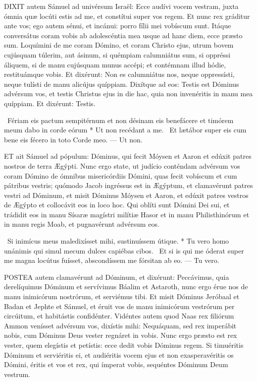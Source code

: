 
\lettrine[lines=2]{D}{IXIT} autem Sámuel ad univérsum Israël: Ecce audívi vocem vestram, juxta ómnia quæ locúti estis ad me, et constítui super vos regem. Et nunc rex gráditur ante vos; ego autem sénui, et incánui: porro fílii mei vobíscum sunt. Itáque conversátus coram vobis ab adolescéntia mea usque ad hanc diem, ecce præsto sum. Loquímini de me coram Dómino, et coram Christo ejus, utrum bovem cujúsquam túlerim, aut ásinum, si quémpiam calumniátus sum, si oppréssi áliquem, si de manu cujúsquam munus accépi; et contémnam illud hódie, restituámque vobis. Et dixérunt: Non es calumniátus nos, neque oppressísti, neque tulísti de manu alicújus quíppiam. Dixítque ad eos: Testis est Dóminus advérsum vos, et testis Christus ejus in die hac, quia non invenéritis in manu mea quíppiam. Et dixérunt: Testis.

\R\ Fériam eis pactum sempitérnum et non désinam eis benefácere et timórem meum dabo in corde eórum * Ut non recédant a me. \V\ Et lætábor super eis cum bene eis fécero in toto Corde meo. --- Ut non.


\lettrine[lines=2]{E}{T} ait Sámuel ad pópulum: Dóminus, qui fecit Móysen et Aaron et edúxit patres nostros de terra Ægýpti. Nunc ergo state, ut judício conténdam advérsum vos coram Dómino de ómnibus misericórdiis Dómini, quas fecit vobíscum et cum pátribus vestris; quómodo Jacob ingréssus est in Ægýptum, et clamavérunt patres vestri ad Dóminum, et misit Dóminus Móysen et Aaron, et edúxit patres vestros de Ægýpto et collocávit eos in loco hoc. Qui oblíti sunt Dómini Dei sui, et trádidit eos in manu Sísaræ magístri milítiæ Hasor et in manu Philisthinórum et in manu regis Moab, et pugnavérunt advérsum eos.

\R\ Si inimícus meus maledixísset mihi, sustinuíssem útique. * Tu vero homo unánimis qui simul mecum dulces capiébas cibos. \V\ Et si is qui me óderat super me magna locútus fuísset, abscondíssem me fórsitan ab eo. --- Tu vero.


\lettrine[lines=2]{P}{OSTEA} autem clamavérunt ad Dóminum, et dixérunt: Peccávimus, quia derelíquimus Dóminum et servívimus Báalim et Astaroth, nunc ergo érue nos de manu inimicórum nostrórum, et serviémus tibi. Et misit Dóminus Jeróbaal et Badan et Jephte et Sámuel, et éruit vos de manu inimicórum vestrórum per circúitum, et habitástis confidénter. Vidéntes autem quod Naas rex filiórum Ammon venísset advérsum vos, dixístis mihi: Nequáquam, sed rex imperábit nobis, cum Dóminus Deus vester regnáret in vobis. Nunc ergo præsto est rex vester, quem elegístis et petístis: ecce dedit vobis Dóminus regem. Si timuéritis Dóminum et serviéritis ei, et audiéritis vocem ejus et non exasperavéritis os Dómini, éritis et vos et rex, qui ímperat vobis, sequéntes Dóminum Deum vestrum.


